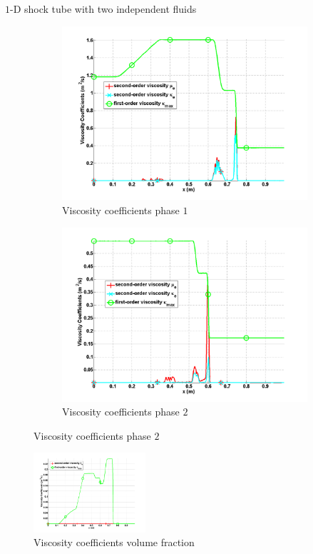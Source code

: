 \documentclass[xcolor=dvipsnames,10pt]{beamer}
\begin{document}
\begin{frame}{$1$-D shock tube with two independent fluids}
\begin{figure}
        \begin{subfigure}[b]{0.37\textwidth}
                \centering
                \includegraphics[width=\textwidth]{../figures/SEM/two_phases_liquid_viscosity_kappa_mu.png}
                \caption{Viscosity coefficients phase $1$}
        \end{subfigure}%
        \begin{subfigure}[b]{0.37\textwidth}
                \centering
                \includegraphics[width=\textwidth]{../figures/SEM/two_phases_vapor_viscosity_kappa_mu.png}
                \caption{Viscosity coefficients phase $2$}
        \end{subfigure}%
\end{figure}
\begin{figure}[H]        
\centering
\includegraphics[width=0.37\textwidth]{../figures/SEM/two_phases_liquid_beta.png}
\caption{Viscosity coefficients volume fraction}
\end{figure}
\end{frame}
\end{document}
